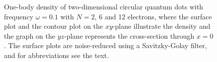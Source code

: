 \begin{figure}
	\hspace{0.1cm}
	\hspace{-0.cm}
	\hspace{-0.cm}
	
	\caption{One-body density of two-dimensional circular quantum dots with frequency $\omega=0.1$ with $N=2$, 6 and 12 electrons, where the surface plot and the contour plot on the $xy$-plane illustrate the density and the graph on the $yz$-plane represents the cross-section through $x=0$. The surface plots are noise-reduced using a Savitzky-Golay filter, and for abbreviations see the text.}
	\label{fig:lowfreqRBM}
\end{figure}

\newpage
